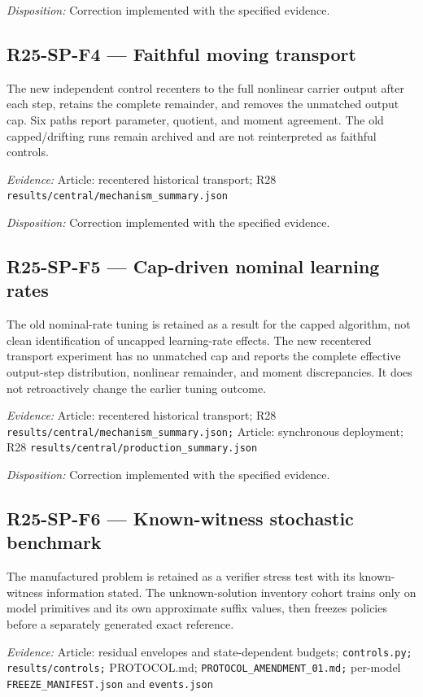\emph{Disposition:} Correction implemented with the specified evidence.
\subsection{R25-SP-F4 --- Faithful moving transport}
The new independent control recenters to the full nonlinear carrier output after each step, retains the complete remainder, and removes the unmatched output cap. Six paths report parameter, quotient, and moment agreement. The old capped/drifting runs remain archived and are not reinterpreted as faithful controls.

\emph{Evidence:} Article: recentered historical transport; R28 \nolinkurl{results/central/mechanism_summary.json}

\emph{Disposition:} Correction implemented with the specified evidence.
\subsection{R25-SP-F5 --- Cap-driven nominal learning rates}
The old nominal-rate tuning is retained as a result for the capped algorithm, not clean identification of uncapped learning-rate effects. The new recentered transport experiment has no unmatched cap and reports the complete effective output-step distribution, nonlinear remainder, and moment discrepancies. It does not retroactively change the earlier tuning outcome.

\emph{Evidence:} Article: recentered historical transport; R28 \nolinkurl{results/central/mechanism_summary.json;} Article: synchronous deployment; R28 \nolinkurl{results/central/production_summary.json}

\emph{Disposition:} Correction implemented with the specified evidence.
\subsection{R25-SP-F6 --- Known-witness stochastic benchmark}
The manufactured problem is retained as a verifier stress test with its known-witness information stated. The unknown-solution inventory cohort trains only on model primitives and its own approximate suffix values, then freezes policies before a separately generated exact reference.

\emph{Evidence:} Article: residual envelopes and state-dependent budgets; \nolinkurl{controls.py;} \nolinkurl{results/controls;} PROTOCOL.md; \nolinkurl{PROTOCOL_AMENDMENT_01.md;} per-model \nolinkurl{FREEZE_MANIFEST.json} and \nolinkurl{events.json}


